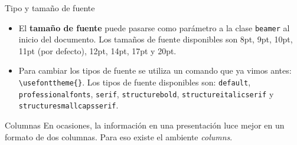 \documentclass{beamer}
\begin{document}
    \begin{frame}[fragile]{Tipo y tamaño de fuente}
        \begin{minipage}{0.93\paperwidth}
        \begin{itemize}
            \justifying
            \item El \textbf{tamaño de fuente} puede pasarse como parámetro a la clase \texttt{beamer} al inicio del documento.
            Los tamaños de fuente disponibles son 8pt, 9pt, 10pt, 11pt (por defecto), 12pt, 14pt, 17pt y 20pt.
            \item Para cambiar los tipos de fuente se utiliza un comando que ya vimos antes:  {\color{mygreen} \verb|\usefonttheme{}|}.
            Los tipos de fuente disponibles son: \texttt{default}, \texttt{professionalfonts}, \texttt{serif}, \texttt{structurebold},
            \texttt{structureitalicserif} y \texttt{structuresmallcapsserif}.
        \end{itemize}
        \end{minipage}
    \end{frame}
    
    \begin{frame}[fragile]{Columnas}
        En ocasiones, la información en una presentación luce mejor en un formato de dos columnas. Para eso existe el ambiente
        \textsl{columns}.
        \vspace{5mm}
        \begin{center}
            \begin{minipage}{0.89\textwidth}
                \inputminted[fontsize=\tiny, frame=single]{latex}{two_columns.tex}
            \end{minipage}
        \end{center}
    \end{frame}
\end{document}
